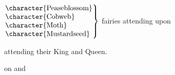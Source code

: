 \begin{description}[font=\scshape]
	$\left.
		\begin{tabular}{@{}l@{}}
			\character{Peaseblossom} \\
			\character{Cobweb} \\
			\character{Moth} \\
			\character{Mustardseed} \\
		\end{tabular}
	\right\}$
	\hspace{\labelsep}fairies attending upon 
\smallskip
\item[Other Fairies] attending their King and Queen.
\item[Attendants] on  and 
\end{description}